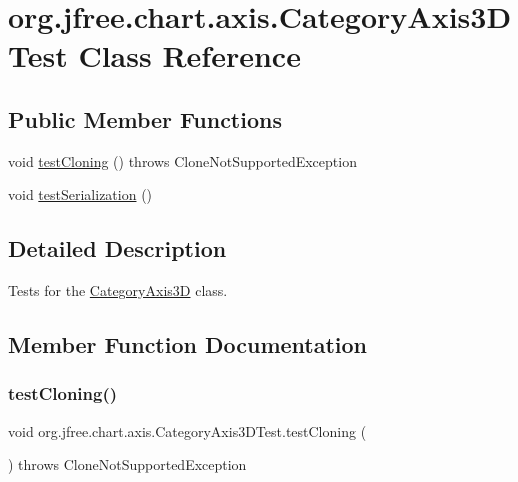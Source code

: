 \hypertarget{classorg_1_1jfree_1_1chart_1_1axis_1_1_category_axis3_d_test}{}\section{org.\+jfree.\+chart.\+axis.\+Category\+Axis3\+D\+Test Class Reference}
\label{classorg_1_1jfree_1_1chart_1_1axis_1_1_category_axis3_d_test}
\subsection*{Public Member Functions}
\begin{DoxyCompactItemize}
\item 
void \mbox{\hyperlink{classorg_1_1jfree_1_1chart_1_1axis_1_1_category_axis3_d_test_ae3b4ceb5f9497a06bd48cc369731600e}{test\+Cloning}} ()  throws Clone\+Not\+Supported\+Exception 
\item 
void \mbox{\hyperlink{classorg_1_1jfree_1_1chart_1_1axis_1_1_category_axis3_d_test_a7bf6a3b20bb752f0628d4694c54c3b9e}{test\+Serialization}} ()
\end{DoxyCompactItemize}


\subsection{Detailed Description}
Tests for the \mbox{\hyperlink{classorg_1_1jfree_1_1chart_1_1axis_1_1_category_axis3_d}{Category\+Axis3D}} class. 

\subsection{Member Function Documentation}
\mbox{\label{classorg_1_1jfree_1_1chart_1_1axis_1_1_category_axis3_d_test_ae3b4ceb5f9497a06bd48cc369731600e}} 
\subsubsection{\texorpdfstring{test\+Cloning()}{testCloning()}}
{\footnotesize\ttfamily void org.\+jfree.\+chart.\+axis.\+Category\+Axis3\+D\+Test.\+test\+Cloning (\begin{DoxyParamCaption}{ }\end{DoxyParamCaption}) throws Clone\+Not\+Supported\+Exception}

